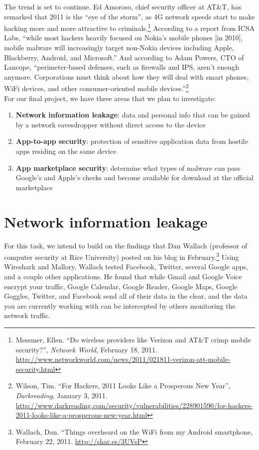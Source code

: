 \documentclass[11pt]{article}
\begin{document}
The trend is set to continue. Ed Amoroso, chief security officer at AT\&T, has
remarked that 2011 is the ``eye of the storm'', as 4G network speeds start to
make hacking more and more attractive to criminals.\footnote{Messmer, Ellen.
``Do wireless providers like Verizon and AT\&T crimp mobile security?'',
\textit{Network World}, February 18, 2011.
\url{http://www.networkworld.com/news/2011/021811-verizon-att-mobile-security.html}}
According to a report from ICSA Labs, ``while most hackers heavily focused on
Nokia's mobile phones [in 2010], mobile malware will increasingly target
non-Nokia devices including Apple, Blackberry, Android, and Microsoft.'' And
according to Adam Powers, CTO of Lancope, ``perimeter-based defenses, such as
firewalls and IPS, aren't enough anymore. Corporations must think about how
they will deal with smart phones, WiFi devices, and other consumer-oriented
mobile devices.''\footnote{Wilson, Tim. ``For Hackers, 2011 Looks Like a
Prosperous New Year'', \textit{Darkreading}, January 3, 2011.
\url{http://www.darkreading.com/security/vulnerabilities/228901590/for-hackers-2011-looks-like-a-prosperous-new-year.html}}\\

For our final project, we have three areas that we plan to investigate:
\begin{enumerate}
\item \textbf{Network information leakage}: data and personal info that can be
gained by a network eavesdropper without direct access to the device
\item \textbf{App-to-app security}: protection of sensitive application data
from hostile apps residing on the same device
\item \textbf{App marketplace security}: determine what types of malware can
pass Google's and Apple's checks and become available for download at the
official marketplace
\end{enumerate}

\section{Network information leakage}
For this task, we intend to build on the findings that Dan Wallach (professor
of computer security at Rice University) posted on his blog in
February.\footnote{Wallach, Dan. ``Things overheard on the WiFi from my Android
smartphone, February 22, 2011. \url{http://shar.es/3UVsP}} Using Wireshark and
Mallory, Wallach tested Facebook, Twitter, several Google apps, and a couple
other applications. He found that while Gmail and Google Voice encrypt your
traffic, Google Calendar, Google Reader, Google Maps, Google Goggles, Twitter,
and Facebook send all of their data in the clear, and the data you are
currently working with can be intercepted by others monitoring the network
traffic.
\end{document}
